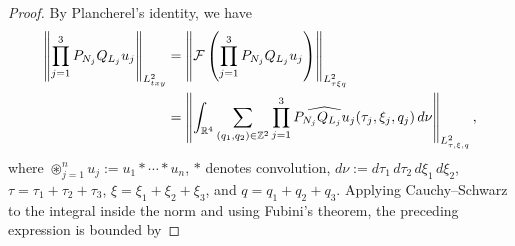 \documentclass[12pt,oneside,reqno]{amsart}
\numberwithin{equation}{section}
\theoremstyle{plain}
\def\R{{\mathbb R}}
\def\Z{{\mathbb Z}}
\newcommand{\Lptxy}[3]{%
    \left\lVert #1\right\rVert_{L^{#2}_{#3}}%
}
\newcommand{\PQ}[2]{%
    P_{N_{#2}}Q_{L_{#2}}#1_{#2}%
}
\newcommand{\FPQwV}[2]{%
    \widehat{%
        P_{N_{#2}}Q_{L_{#2}}#1_{#2}%
    }%
    (\tau_{#2},\xi_{#2},q_{#2})%
}
\begin{document}
\begin{proof}
    By Plancherel's identity, we have
\begin{align*}
\Lptxy{
    \prod_{j=1}^3\PQ{u}{j}
}{2}{txy}
&=
\Lptxy{
    \mathcal F
    \left(
        \prod_{j=1}^3\PQ{u}{j}
    \right)
}{2}{\tau\xi q}
\\
&=
\left\|
    \int_{\R^4}
    \sum_{(q_1,q_2)\in\Z^2}
    \prod_{j=1}^3
    \FPQwV{u}{j}
    \,d\nu
\right\|_{L^2_{\tau,\xi,q}},
\end{align*}
where $\circledast_{j=1}^n u_j:=u_1\ast\cdots\ast u_n$, $\ast$ denotes
convolution, $d\nu:=d\tau_1\,d\tau_2\,d\xi_1\,d\xi_2$,
$\tau=\tau_1+\tau_2+\tau_3$, $\xi=\xi_1+\xi_2+\xi_3$, and
$q=q_1+q_2+q_3$. Applying Cauchy--Schwarz to the integral inside the norm and
using Fubini's theorem, the preceding expression is bounded by


\end{proof}
\end{document}
